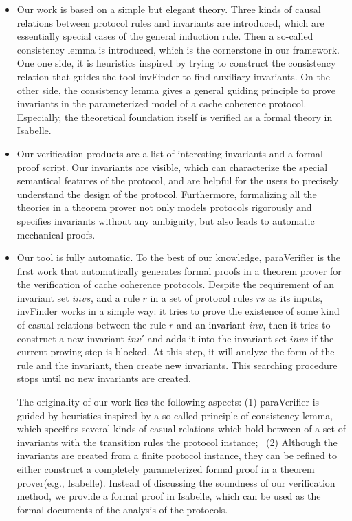 \begin{itemize}
\item Our work is based on a simple but elegant theory. Three kinds of causal
relations between protocol rules and invariants are introduced, which are
essentially special cases of the general induction rule. Then a
so-called consistency lemma is introduced, which is the cornerstone in
our framework. One one side, it is heuristics inspired by trying to
construct the consistency relation that guides the tool {\sf
invFinder} to find auxiliary invariants. On the other side, the
consistency lemma gives a general guiding principle to prove
invariants  in the parameterized model of a cache coherence
protocol. Especially, the theoretical foundation itself is verified as a
formal theory in Isabelle.

\item Our verification products are a list of interesting invariants
and a formal proof script. Our invariants are visible,
which can characterize the special semantical features of the protocol,
and are helpful for the users to precisely understand the design of the protocol.
Furthermore, formalizing all the theories in a theorem prover not only models protocols
rigorously and specifies invariants without any ambiguity, but also
leads to automatic mechanical proofs.

\item Our tool is fully automatic.
To the best of our knowledge, {\sf paraVerifier} is the first work
that automatically generates formal proofs in a theorem prover for
the verification of cache coherence protocols. 
%
Despite the requirement of an invariant set $invs$, and a rule $r$ in a set of
protocol rules $rs$ as its inputs, {\sf invFinder} works in a simple way: it
tries to prove the existence of some kind of casual relations
between the rule $r$ and an invariant $inv$, then it tries to construct a new
invariant $inv'$ and adds it into the invariant set $invs$ if the
current proving step is blocked. At this step, it will analyze the
form of the rule and the invariant, then create new invariants. This
searching procedure stops until no new invariants are created. 

The originality of our work lies the following aspects: (1) {\sf
paraVerifier} is guided by heuristics inspired by a so-called
principle of consistency lemma, which specifies several kinds of
casual relations which hold between of a set of invariants with the
transition rules the protocol instance;~\cite{LiCache13} (2)
Although the invariants are created from a finite protocol instance,
they can be refined to either construct a completely parameterized
formal proof in a theorem prover(e.g., Isabelle). Instead of
discussing the soundness of our verification method, we provide a
formal proof in Isabelle, which can be used as the formal documents
of the analysis of the protocols.



\end{itemize}

